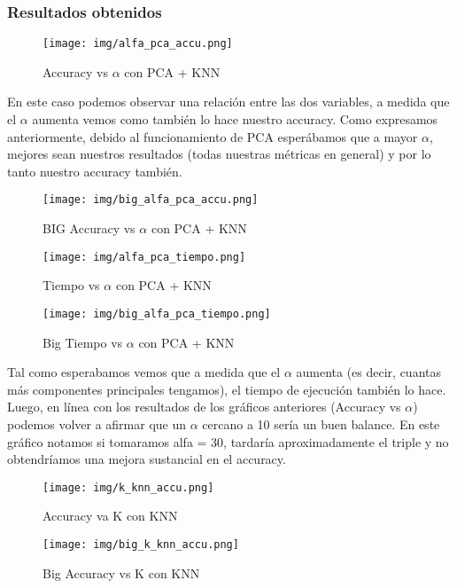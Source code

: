 \subsubsection*{Resultados obtenidos}

\begin{figure}[H]
	\centering	\texttt{[image: img/alfa\_pca\_accu.png]}
	\caption{Accuracy vs $\alpha$ con PCA + KNN}
	\label{fig:Accuracy vs Alpha con KNN + PCA}
\end{figure}

En este caso podemos observar una relación entre las dos variables, a medida que el $\alpha$ aumenta vemos como también lo hace nuestro accuracy.
Como expresamos anteriormente, debido al funcionamiento de PCA esperábamos que a mayor $\alpha$, mejores sean nuestros resultados (todas nuestras métricas en general) y por lo tanto nuestro accuracy también.

\begin{figure}[H]
	\centering	\texttt{[image: img/big\_alfa\_pca\_accu.png]}
	\caption{BIG Accuracy vs $\alpha$ con PCA + KNN}
	\label{fig: BIG Accuracy vs Alpha con KNN + PCA}
\end{figure}



\begin{figure}[H]
	\centering	\texttt{[image: img/alfa\_pca\_tiempo.png]}
	\caption{Tiempo vs $\alpha$ con PCA + KNN}
	\label{fig:Tiempo vs Alpha con PCA + KNN}
\end{figure}

\begin{figure}[H]
	\centering	\texttt{[image: img/big\_alfa\_pca\_tiempo.png]}
	\caption{Big Tiempo vs $\alpha$ con PCA + KNN}
	\label{fig:Big Tiempo vs Alpha con PCA + KNN}
\end{figure}


Tal como esperabamos vemos que a medida que el $\alpha$ aumenta (es decir, cuantas más componentes principales tengamos), el tiempo de ejecución también lo hace.
Luego, en línea con los resultados de los gráficos anteriores (Accuracy vs $\alpha$) podemos volver a afirmar que un $\alpha$ cercano a 10 sería un buen balance. En este gráfico notamos si tomaramos alfa = 30, tardaría aproximadamente el triple y no obtendríamos una mejora sustancial en el accuracy.



\begin{figure}[H]
	\centering	\texttt{[image: img/k\_knn\_accu.png]}
	\caption{Accuracy va K con KNN}
	\label{fig:Accuracy vs K con KNN}
\end{figure}
\begin{figure}[H]
	\centering	\texttt{[image: img/big\_k\_knn\_accu.png]}
	\caption{Big Accuracy vs K con KNN}
	\label{fig:Big Accuracy vs K con KNN}
\end{figure}



